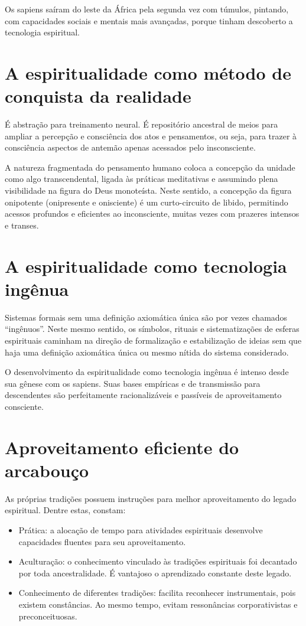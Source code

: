 \documentclass[a4paper]{article}
\begin{document}
Os sapiens saíram do leste da África pela segunda vez com túmulos, pintando, com
capacidades sociais e mentais mais avançadas, porque tinham descoberto a
tecnologia espiritual.

\section{A espiritualidade como método de conquista da realidade}\label{met}

É abstração para treinamento neural. É repositório ancestral de meios para
ampliar a percepção e consciência dos atos e pensamentos, ou seja, para trazer à
consciência aspectos de antemão apenas acessados pelo insconsciente.

A natureza fragmentada do pensamento humano coloca a concepção da unidade como
algo transcendental, ligada às práticas meditativas e assumindo plena
visibilidade na figura do Deus monoteísta. Neste sentido, a concepção da figura
onipotente (onipresente e onisciente) é um curto-circuito de libido, permitindo
acessos profundos e eficientes ao inconsciente, muitas vezes com prazeres
intensos e transes.

\section{A espiritualidade como tecnologia ingênua}

Sistemas formais sem uma definição axiomática única são por vezes chamados
``ingênuos''. Neste mesmo sentido, os símbolos, rituais e sistematizações de
esferas espirituais caminham na direção de formalização e estabilização de
ideias sem que haja uma definição axiomática única ou mesmo nítida do sistema
considerado.

O desenvolvimento da espiritualidade como tecnologia ingênua é intenso desde sua
gênese com os sapiens. Suas bases empíricas e de transmissão para descendentes
são perfeitamente racionalizáveis e passíveis de aproveitamento consciente.

\section{Aproveitamento eficiente do arcabouço}

As próprias tradições possuem instruções para melhor aproveitamento do legado
espiritual. Dentre estas, constam:

\begin{itemize}
  \item Prática: a alocação de tempo para atividades espirituais desenvolve
  capacidades fluentes para seu aproveitamento.

  \item Aculturação: o conhecimento vinculado às tradições espirituais foi
  decantado por toda ancestralidade. É vantajoso o aprendizado constante deste
  legado.

  \item Conhecimento de diferentes tradições: facilita reconhecer instrumentais,
  pois existem constâncias. Ao mesmo tempo, evitam ressonâncias corporativistas
  e preconceituosas.
\end{itemize}
\end{document}
